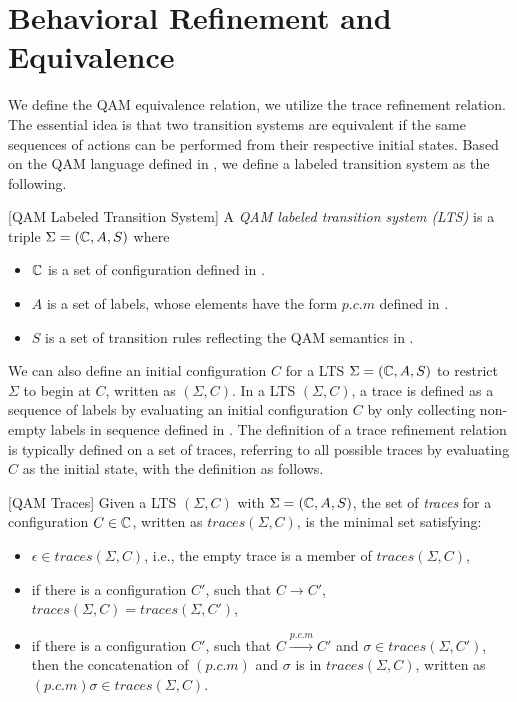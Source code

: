 \section{Behavioral Refinement and Equivalence} \label{sec:refinement}

We define the QAM equivalence relation, we utilize the trace refinement relation.
The essential idea is that two transition systems are equivalent if the same sequences of actions can be performed
from their respective initial states.
Based on the QAM language defined in , we define a labeled transition system as the following.

\begin{definition}\label{def:labeledsystem}\rm[QAM Labeled Transition System]
A \emph{QAM labeled transition system (LTS)} is a triple $\Sigma=(\mathbb{C},A,S)$ where
\begin{itemize}
\item $\mathbb{C}$ is a set of configuration defined in .
\item $A$ is a set of labels, whose elements have the form $p.c.m$ defined in .
\item $S$ is a set of transition rules reflecting the QAM semantics in .
\end{itemize}
\end{definition}

We can also define an initial configuration $C$ for a LTS $\Sigma=(\mathbb{C},A,S)$ to restrict $\Sigma$ to begin at $C$, written as $(\Sigma,C)$.
In a LTS $(\Sigma,C)$, a trace is defined as a sequence of labels by evaluating an initial configuration $C$ by only collecting non-empty labels in sequence defined in . The definition of a trace refinement relation is typically defined on a set of traces, referring to all possible traces by evaluating $C$ as the initial state, with the definition as follows.

\begin{definition}\label{def:traces}\rm[QAM Traces]
Given a LTS $(\Sigma,C)$ with $\Sigma=(\mathbb{C},A,S)$, the set of \emph{traces} for a configuration $C\in \mathbb{C}$, written as $traces(\Sigma,C)$,
is the minimal set satisfying:

\begin{itemize}
\item $\epsilon\in traces(\Sigma,C)$, i.e., the empty trace is a member of $traces(\Sigma,C)$,
\item if there is a configuration $C'$, such that $C\longrightarrow C'$, $traces(\Sigma,C)=traces(\Sigma,C')$,
\item if there is a configuration $C'$, such that $C\xrightarrow{p.c.m}C'$ and $\sigma\in traces(\Sigma,C')$,
then the concatenation of $(p.c.m)$ and $\sigma$ is in $traces(\Sigma,C)$, written as $(p.c.m)\sigma \in traces(\Sigma,C)$.
\end{itemize}
\end{definition}

